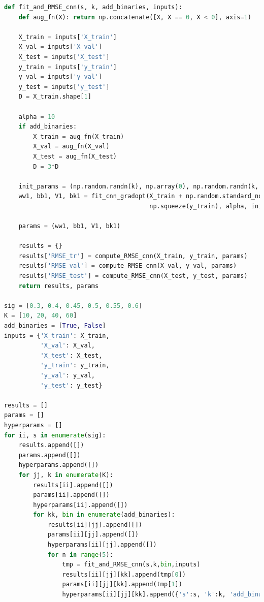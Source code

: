 \documentclass{article}
\begin{document}
\begin{lstlisting}[language=Python]
def fit_and_RMSE_cnn(s, k, add_binaries, inputs):
    def aug_fn(X): return np.concatenate([X, X == 0, X < 0], axis=1)

    X_train = inputs['X_train']
    X_val = inputs['X_val']
    X_test = inputs['X_test']
    y_train = inputs['y_train']
    y_val = inputs['y_val']
    y_test = inputs['y_test']
    D = X_train.shape[1]

    alpha = 10
    if add_binaries:
        X_train = aug_fn(X_train)
        X_val = aug_fn(X_val)
        X_test = aug_fn(X_test)
        D = 3*D

    init_params = (np.random.randn(k), np.array(0), np.random.randn(k, D), np.zeros(k))
    ww1, bb1, V1, bk1 = fit_cnn_gradopt(X_train + np.random.standard_normal(X_train.shape) * s,
                                        np.squeeze(y_train), alpha, init_params)

    params = (ww1, bb1, V1, bk1)

    results = {}
    results['RMSE_tr'] = compute_RMSE_cnn(X_train, y_train, params)
    results['RMSE_val'] = compute_RMSE_cnn(X_val, y_val, params)
    results['RMSE_test'] = compute_RMSE_cnn(X_test, y_test, params)
    return results, params

sig = [0.3, 0.4, 0.45, 0.5, 0.55, 0.6]
K = [10, 20, 40, 60]
add_binaries = [True, False]
inputs = {'X_train': X_train,
          'X_val': X_val,
          'X_test': X_test,
          'y_train': y_train,
          'y_val': y_val,
          'y_test': y_test}

results = []
params = []
hyperparams = []
for ii, s in enumerate(sig):
    results.append([])
    params.append([])
    hyperparams.append([])
    for jj, k in enumerate(K):
        results[ii].append([])
        params[ii].append([])
        hyperparams[ii].append([])
        for kk, bin in enumerate(add_binaries):
            results[ii][jj].append([])
            params[ii][jj].append([])
            hyperparams[ii][jj].append([])
            for n in range(5):
                tmp = fit_and_RMSE_cnn(s,k,bin,inputs)
                results[ii][jj][kk].append(tmp[0])
                params[ii][jj][kk].append(tmp[1])
                hyperparams[ii][jj][kk].append({'s':s, 'k':k, 'add_binaries':bin, 'n':n})

\end{lstlisting}
\end{document}
